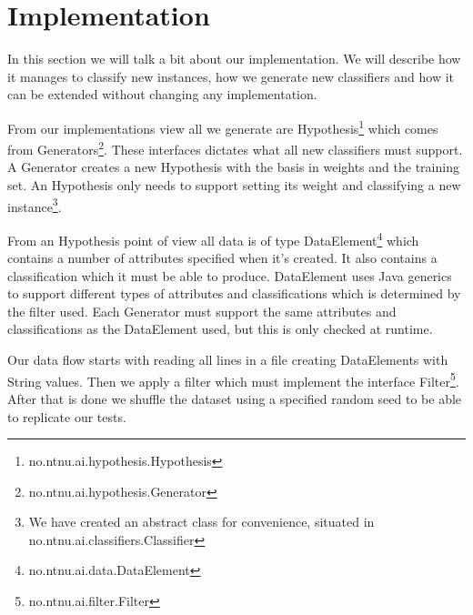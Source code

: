 \section{Implementation}\label{implementation}
In this section we will talk a bit about our implementation. We will describe
how it manages to classify new instances, how we generate new classifiers and
how it can be extended without changing any implementation.

From our \adaboost{} implementations view all we generate are Hypothesis\footnote{
no.ntnu.ai.hypothesis.Hypothesis} which comes from Generators\footnote{
no.ntnu.ai.hypothesis.Generator}. These interfaces dictates what all new
classifiers must support. A Generator creates a new Hypothesis with the basis
in weights and the training set. An Hypothesis only needs to support setting
its weight and classifying a new instance\footnote{We have created an abstract
class for convenience, situated in no.ntnu.ai.classifiers.Classifier}.

From an Hypothesis point of view all data is of type DataElement\footnote{
no.ntnu.ai.data.DataElement} which contains a number of attributes specified when
it's created. It also contains a classification which it must be able to produce.
DataElement uses Java generics to support different types of attributes and 
classifications which is determined by the filter used. Each Generator must
support the same attributes and classifications as the DataElement used, but
this is only checked at runtime.

Our data flow starts with reading all lines in a file creating DataElements
with String values. Then we apply a filter which must implement the interface
Filter\footnote{no.ntnu.ai.filter.Filter}. After that is done we shuffle the
dataset using a specified random seed to be able to replicate our tests.
